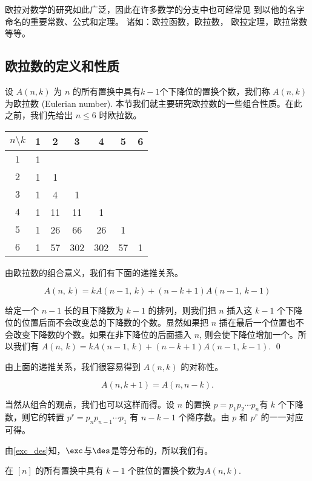 欧拉对数学的研究如此广泛，因此在许多数学的分支中也可经常见
到以他的名字
命名的重要常数、公式和定理。 诸如：欧拉函数，欧拉数，
欧拉定理，欧拉常数等等。




\subsection{欧拉数的定义和性质}
设 $A(n,k)$ 为 $n$ 的所有置换中具有$k-1$个下降位的置换个数，我们称
$A(n,k)$ 为欧拉数 (Eulerian number).
本节我们就主要研究欧拉数的一些组合性质。在此之前，我们先给出 $n\leq
6$ 时欧拉数。

\begin{tabular}{c|c|c|c|c|c|c}
 $n \setminus k$    &1 &2 &3  &4  &5  &6\\
\hline $1$       &1  \\
\hline $2$       &1 &1 \\
\hline $3$       &1 &4 &1  \\
\hline $4$       &1 &11 &11  &1 \\
\hline $5$       &1 &26 &66  &26  &1 \\
\hline $6$       &1 &57 &302 &302 &57 &1
\end{tabular}

由欧拉数的组合意义，我们有下面的递推关系。

\begin{prop}\label{p1}
\begin{equation}
A(n,\,k)=kA(n-1,\, k)+(n-k+1)A(n-1,\,k-1)
\end{equation}
\end{prop}

\pf 给定一个 $n-1$ 长的且下降数为 $k-1$ 的排列，则我们把 $n$ 插入这
$k-1$ 个下降位的位置后面不会改变总的下降数的个数。显然如果把 $n$
插在最后一个位置也不会改变下降数的个数。如果在非下降位的后面插入
$n$, 则会使下降位增加一个。所以我们有 $A(n,\,k)=kA(n-1,\,
k)+(n-k+1)A(n-1,\,k-1).$ \qed

由上面的递推关系，我们很容易得到 $A(n,k)$ 的对称性。
\begin{prop}
\begin{equation}
A(n,k+1)=A(n,n-k).
\end{equation}
\end{prop}

当然从组合的观点，我们也可以这样而得。设 $n$ 的置换 $p=p_{1}p_{2}
\cdots p_n$有 $k$ 个下降数，则它的转置 $p^r=p_{n}p_{n-1}\cdots p_1$
有 $n-k-1$ 个降序数。由 $p$ 和 $p^r$ 的一一对应可得。

由\ref{exc_des}知，$\exc$与$\des$是等分布的，所以我们有。
\begin{prop}
在 $[n]$ 的所有置换中具有 $k-1$ 个胜位的置换个数为$A(n,k)$.
\end{prop}


